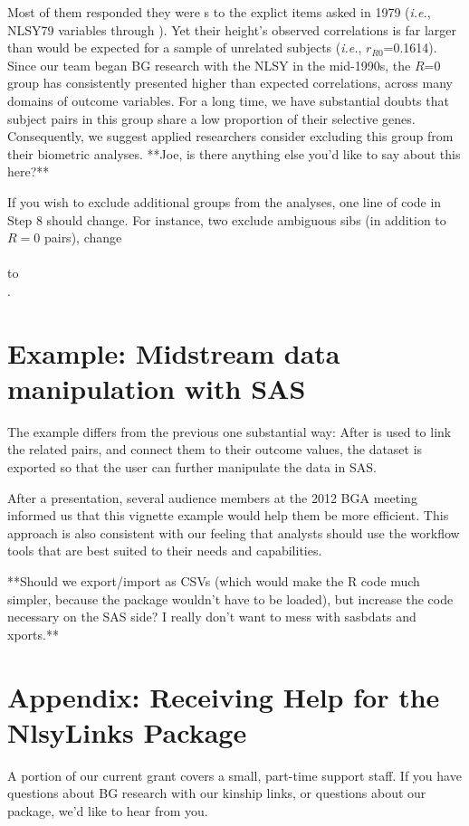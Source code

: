 \documentclass[letterpaper]{article}\usepackage{graphicx, color}
\begin{document}
Most of them responded they were s  to the explict items asked in 1979 (\emph{i.e.}, NLSY79 variables  through ).  Yet their height's observed correlations is far larger than would be expected for a sample of unrelated subjects (\emph{i.e.}, $r_{R0}$=0.1614).  Since our team began BG research with the NLSY in the mid-1990s, the $R$=0 group has consistently presented higher than expected correlations, across many domains of outcome variables.  For a long time, we have substantial doubts that subject pairs in this group share a low proportion of their selective genes.  Consequently, we suggest applied researchers consider excluding this group from their biometric analyses.  **Joe, is there anything else you'd like to say about this here?**

If you wish to exclude additional groups from the analyses, one line of code in Step 8 should change.  For instance, two exclude ambiguous sibs (in addition to $R=0$ pairs), change\\  \\to \\ .

\section{Example: Midstream data manipulation with SAS}
The example differs from the previous one substantial way: After \R{} is used to link the related pairs, and connect them to their outcome values, the dataset is exported so that the user can further manipulate the data in SAS.  

After a presentation, several audience members at the 2012 BGA meeting informed us that this vignette example would help them be more efficient.  This approach is also consistent with our feeling that analysts should use the workflow tools that are best suited to their needs and capabilities.

**Should we export/import as CSVs (which would make the R code much simpler, because the  package wouldn't have to be loaded), but increase the code necessary on the SAS side? I really don't want to mess with sasbdats and xports.**

\appendix
\section{Appendix: Receiving Help for the NlsyLinks Package}
\label{sec:ReceivingHelp} A portion of our current grant covers a small, part-time support
staff.  If you have questions about BG research with our kinship links, or
questions about our package, we'd like to hear from you.
\end{document}
